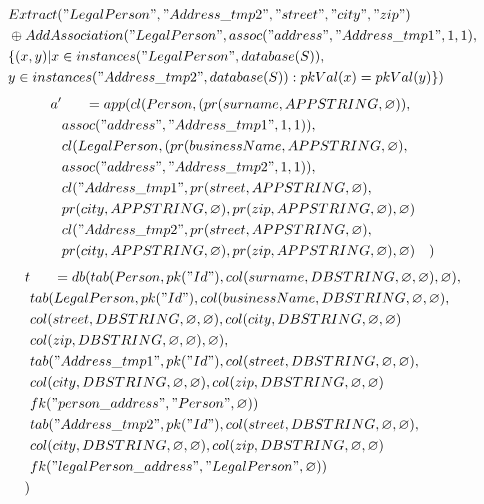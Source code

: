 \documentclass[11pt]{article}
\begin{document}
\newpage
\begin{align*}
& Extract("LegalPerson", "Address\_tmp2", "street", "city", "zip")  \\
& \oplus AddAssociation("LegalPerson", assoc("address", "Address\_tmp1", 1, 1),\\ 
& \{(x,y)| x \in instances("LegalPerson", database(S)), \\
& y \in instances("Address\_tmp2", database(S)) : pkVal(x) = pkVal(y) \}) \\
\end{align*}
\hline
\begin{align*}
a' & \;\;\;\;\;\; =app(cl(Person, (pr(surname, APPSTRING, \varnothing)), \\ 
& assoc("address", "Address\_tmp1", 1, 1)), \\ 
& cl(LegalPerson, (pr(businessName, APPSTRING, \varnothing),\\
& assoc("address", "Address\_tmp2", 1, 1)), \\
& cl("Address\_tmp1", pr(street, APPSTRING, \varnothing), \\
& pr(city, APPSTRING, \varnothing), pr(zip, APPSTRING, \varnothing), \varnothing) \\
& cl("Address\_tmp2", pr(street, APPSTRING, \varnothing), \\
& pr(city, APPSTRING, \varnothing), pr(zip, APPSTRING, \varnothing), \varnothing)
& )
\end{align*}
\begin{align*}
t & \;\;\;\;\;\; =db(tab(Person, pk("Id"), col(surname, DBSTRING, \varnothing, \varnothing), \varnothing), \\
& tab(LegalPerson, pk("Id"),  col(businessName, DBSTRING, \varnothing, \varnothing), \\
& col(street, DBSTRING, \varnothing, \varnothing), col(city, DBSTRING, \varnothing, \varnothing) \\
& col(zip, DBSTRING, \varnothing, \varnothing), \varnothing), \\
& tab("Address\_tmp1", pk("Id"), col(street, DBSTRING, \varnothing, \varnothing),\\
& col(city, DBSTRING, \varnothing, \varnothing), col(zip, DBSTRING, \varnothing, \varnothing) \\
& fk("person\_address", "Person", \varnothing))\\
& tab("Address\_tmp2", pk("Id"), col(street, DBSTRING, \varnothing, \varnothing),\\
& col(city, DBSTRING, \varnothing, \varnothing), col(zip, DBSTRING, \varnothing, \varnothing) \\
& fk("legalPerson\_address", "LegalPerson", \varnothing))\\
) 
\end{align*}
\end{document}
